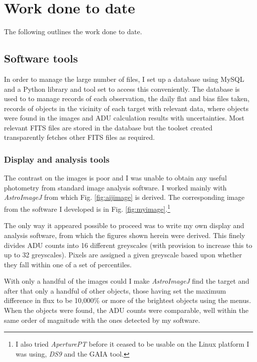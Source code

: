 \section{Work done to date}
\protect\label{section:workdonetodate}

The following outlines the work done to date.

\subsection{Software tools}
\protect\label{section:softwaretools}

In order to manage the large number of files, I set up a database using MySQL
and a Python library and tool set to access this conveniently. The database is
used to to manage records of each observation, the daily flat and bias files
taken, records of objects in the vicinity of each target with relevant data,
where objects were found in the images and ADU calculation results with
uncertainties. Most relevant FITS files are stored in the database but the
toolset created transparently fetches other FITS files as required.

\subsubsection{Display and analysis tools}
\protect\label{section:displayanaltools}

The contrast on the images is poor and I was unable to obtain any useful
photometry from standard image analysis software. I worked mainly with 
\textit{AstroImageJ} from which Fig. \ref{fig:aijimage} is derived. The
corresponding image from the software I developed is in Fig.
\ref{fig:myimage}.\footnote{I also tried \textit{AperturePT} before it ceased to
be usable on the Linux platform I was using, \textit{DS9} and the GAIA tool.}

The only way it appeared possible to proceed was to write my own display and
analysis software, from which the figures shown herein were derived. This finely
divides ADU counts into 16 different greyscales (with provision to increase
this to up to 32 greyscales). Pixels are assigned a given greyscale based upon
whether they fall within one of a set of percentiles.

With only a handful of the images could I make \textit{AstroImageJ} find the
target and after that only a handful of other objects, those having set the maximum
difference in flux to be 10,000\% or more of the brightest objects using the
menus. When the objects were found, the ADU counts were comparable, well within
the same order of magnitude with the ones detected by my software.

